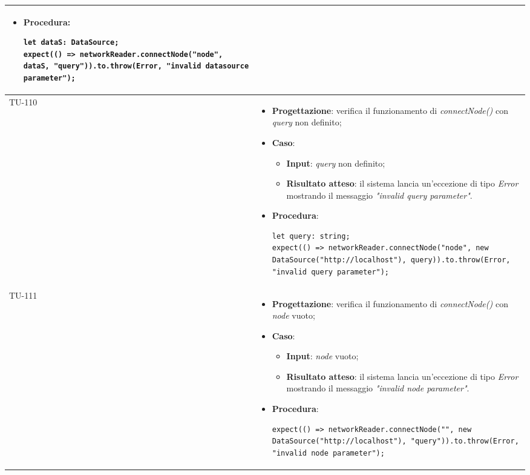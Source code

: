 \begin{longtable}{|C{1.5cm}|C{14.5cm}|}
\begin{itemize}
\begin{itemize}
	\end{itemize}
	\item \textbf{Procedura}:
	\begin{lstlisting}
let dataS: DataSource;
expect(() => networkReader.connectNode("node", dataS, "query")).to.throw(Error, "invalid datasource parameter");
	\end{lstlisting}
\end{itemize}\\
\hline
{TU-110} &
\begin{itemize}
	\item \textbf{Progettazione}: verifica il funzionamento di \emph{connectNode()} con \emph{query} non definito;
	\item \textbf{Caso}: 
	\begin{itemize}
		\item \textbf{Input}: \emph{query} non definito;
		\item \textbf{Risultato atteso}: il sistema lancia un'eccezione di tipo \emph{Error} mostrando il messaggio \emph{"invalid query parameter"}.
	\end{itemize}
	\item \textbf{Procedura}:
	\begin{lstlisting}
let query: string;
expect(() => networkReader.connectNode("node", new DataSource("http://localhost"), query)).to.throw(Error, "invalid query parameter");
	\end{lstlisting}
\end{itemize}\\
\hline
{TU-111} &
\begin{itemize}
	\item \textbf{Progettazione}: verifica il funzionamento di \emph{connectNode()} con \emph{node} vuoto;
	\item \textbf{Caso}: 
	\begin{itemize}
		\item \textbf{Input}: \emph{node} vuoto;
		\item \textbf{Risultato atteso}: il sistema lancia un'eccezione di tipo \emph{Error} mostrando il messaggio \emph{"invalid node parameter"}.
	\end{itemize}
	\item \textbf{Procedura}:
	\begin{lstlisting}
expect(() => networkReader.connectNode("", new DataSource("http://localhost"), "query")).to.throw(Error, "invalid node parameter");
	\end{lstlisting}
\end{itemize}\\

\end{longtable}
